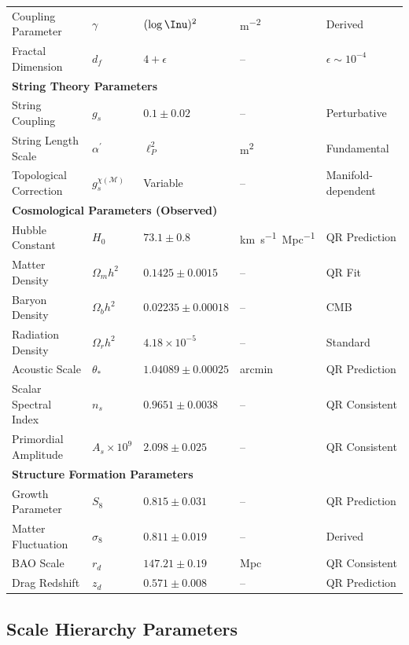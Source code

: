 \begin{table}[H]
\begin{tabular}{@{}lllll@{}}
    Coupling Parameter & $\gamma$ & $(\log \Inu)^2$ & \si{m^{-2}} & Derived \\
    Fractal Dimension & $d_f$ & $4 + \epsilon$ & -- & $\epsilon \sim 10^{-4}$ \\
    \midrule
    \multicolumn{5}{l}{\textbf{String Theory Parameters}} \\
    \midrule
    String Coupling & $g_s$ & $0.1 \pm 0.02$ & -- & Perturbative \\
    String Length Scale & $\alpha^{\prime}$ & $\ell_P^2$ & \si{m^2} & Fundamental \\
    Topological Correction & $g_s^{\chi(\mathcal{M})}$ & Variable & -- & Manifold-dependent \\
    \midrule
    \multicolumn{5}{l}{\textbf{Cosmological Parameters (Observed)}} \\
    \midrule
    Hubble Constant & $H_0$ & $73.1 \pm 0.8$ & \si{km.s^{-1}.Mpc^{-1}} & QR Prediction \\
    Matter Density & $\Omega_m h^2$ & $0.1425 \pm 0.0015$ & -- & QR Fit \\
    Baryon Density & $\Omega_b h^2$ & $0.02235 \pm 0.00018$ & -- & CMB \\
    Radiation Density & $\Omega_r h^2$ & $4.18 \times 10^{-5}$ & -- & Standard \\
    Acoustic Scale & $\theta_\ast$ & $1.04089 \pm 0.00025$ & arcmin & QR Prediction \\
    Scalar Spectral Index & $n_s$ & $0.9651 \pm 0.0038$ & -- & QR Consistent \\
    Primordial Amplitude & $A_s \times 10^9$ & $2.098 \pm 0.025$ & -- & QR Consistent \\
    \midrule
    \multicolumn{5}{l}{\textbf{Structure Formation Parameters}} \\
    \midrule
    Growth Parameter & $S_8$ & $0.815 \pm 0.031$ & -- & QR Prediction \\
    Matter Fluctuation & $\sigma_8$ & $0.811 \pm 0.019$ & -- & Derived \\
    BAO Scale & $r_d$ & $147.21 \pm 0.19$ & \si{Mpc} & QR Consistent \\
    Drag Redshift & $z_d$ & $0.571 \pm 0.008$ & -- & QR Prediction \\
    \bottomrule
  \end{tabular}
\end{table}

\subsection{Scale Hierarchy Parameters}
\label{subsec:scale-hierarchy-parameters}

